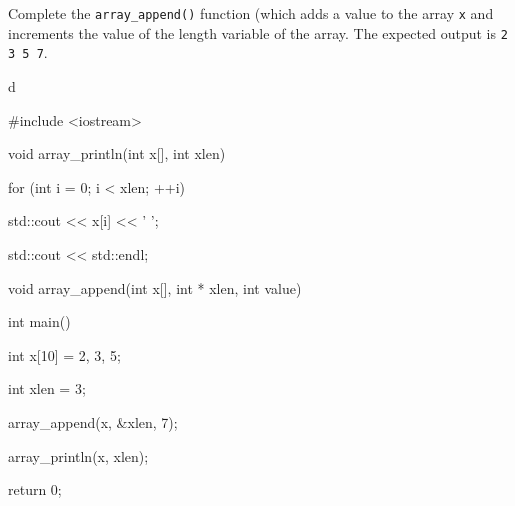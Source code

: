 Complete the \verb!array_append()! function (which adds a value to the array \verb!x! and increments the value of the length variable of the array. The expected output is \verb!2 3 5 7!.

d

\begin{consolethree}[escapeinside=||]

#include <iostream>



void array_println(int x[], int xlen)

{

    for (int i = 0; i < xlen; ++i)

    {

        std::cout << x[i] << ' ';

    }

    std::cout << std::endl;

}



void array_append(int x[], int * xlen, int value)

{

}



int main()

{

    int x[10] = {2, 3, 5};

    int xlen = 3;

    array_append(x, &xlen, 7);

    array_println(x, xlen);

    return 0;

}

\end{consolethree}


